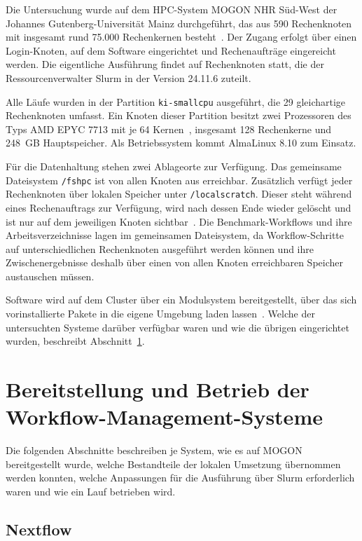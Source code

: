 Die Untersuchung wurde auf dem HPC-System MOGON NHR Süd-West der
Johannes Gutenberg-Universität Mainz durchgeführt, das aus 590
Rechenknoten mit insgesamt rund 75.000 Rechenkernen
besteht~\cite{mogonnhr}. Der Zugang erfolgt über einen
Login-Knoten, auf dem Software eingerichtet und Rechenaufträge
eingereicht werden. Die eigentliche Ausführung findet auf
Rechenknoten statt, die der Ressourcenverwalter Slurm in der
Version 24.11.6 zuteilt.

Alle Läufe wurden in der Partition \texttt{ki-smallcpu} ausgeführt,
die 29 gleichartige Rechenknoten umfasst. Ein Knoten dieser
Partition besitzt zwei Prozessoren des Typs AMD EPYC 7713 mit je 64
Kernen~\cite{mogonnhr}, insgesamt 128 Rechenkerne und 248~GB
Hauptspeicher. Als Betriebssystem kommt AlmaLinux 8.10 zum Einsatz.

Für die Datenhaltung stehen zwei Ablageorte zur Verfügung. Das gemeinsame Dateisystem \texttt{/fshpc} ist von allen Knoten aus
erreichbar. Zusätzlich verfügt jeder Rechenknoten über lokalen Speicher unter
\texttt{/localscratch}. Dieser steht während eines Rechenauftrags
zur Verfügung, wird nach dessen Ende wieder gelöscht und ist nur
auf dem jeweiligen Knoten sichtbar~\cite{mogondocs}. Die Benchmark-Workflows und ihre Arbeitsverzeichnisse
lagen im gemeinsamen Dateisystem, da Workflow-Schritte auf
unterschiedlichen Rechenknoten ausgeführt werden können und ihre
Zwischenergebnisse deshalb über einen von allen Knoten
erreichbaren Speicher austauschen müssen.

Software wird auf dem Cluster über ein Modulsystem bereitgestellt,
über das sich vorinstallierte Pakete in die eigene Umgebung laden
lassen~\cite{mogondocs}. Welche der untersuchten Systeme darüber
verfügbar waren und wie die übrigen eingerichtet wurden, beschreibt
Abschnitt~\ref{sec:mogon:bereitstellung}.


\section{Bereitstellung und Betrieb der Workflow-Management-Systeme}
\label{sec:mogon:bereitstellung}

Die folgenden Abschnitte beschreiben je System, wie es auf MOGON
bereitgestellt wurde, welche Bestandteile der lokalen Umsetzung
übernommen werden konnten, welche Anpassungen für die Ausführung
über Slurm erforderlich waren und wie ein Lauf betrieben wird.
\subsection{Nextflow}
\label{sec:mogon:nextflow}

